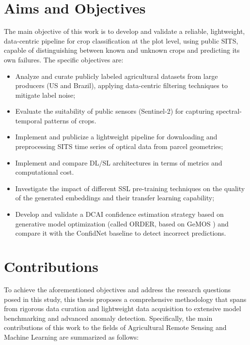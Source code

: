 \section{Aims and Objectives}

The main objective of this work is to develop and validate a reliable, lightweight, data-centric pipeline for crop classification at the plot level, using public SITS, capable of distinguishing between known and unknown crops and predicting its own failures. The specific objectives are:

\begin{itemize}
    \item Analyze and curate publicly labeled agricultural datasets from large producers (US and Brazil), applying data-centric filtering techniques to mitigate label noise;
    \item Evaluate the suitability of public sensors (Sentinel-2) for capturing spectral-temporal patterns of crops.
    \item Implement and publicize a lightweight pipeline for downloading and preprocessing SITS time series of optical data from parcel geometries;
    \item Implement and compare DL/SL architectures in terms of metrics and computational cost.
    \item Investigate the impact of different SSL pre-training techniques on the quality of the generated embeddings and their transfer learning capability;
    \item Develop and validate a DCAI confidence estimation strategy based on generative model optimization (called \ac{ORDER}, based on \ac{GeMOS} \citep{vendramini2021opening}) and compare it with the ConfidNet \citep{corbiere2019addressing} baseline to detect incorrect predictions.
\end{itemize}

\section{Contributions}

To achieve the aforementioned objectives and address the research questions posed in this study, this thesis proposes a comprehensive methodology that spans from rigorous data curation and lightweight data acquisition to extensive model benchmarking and advanced anomaly detection. Specifically, the main contributions of this work to the fields of Agricultural Remote Sensing and Machine Learning are summarized as follows:

